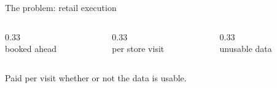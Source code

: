 \begin{frame}{The problem: retail execution}
  \centering
  \begin{columns}[T]
    \begin{column}{0.33\textwidth}\centering
      {\fontsize{28}{32}\selectfont\bfseries\color{cardano}\LeadTimeDays}\\ booked ahead
    \end{column}
    \begin{column}{0.33\textwidth}\centering
      {\fontsize{28}{32}\selectfont\bfseries\color{cardano}\CostPerVisit}\\ per store visit
    \end{column}
    \begin{column}{0.33\textwidth}\centering
      {\fontsize{28}{32}\selectfont\bfseries\color{cardano}\WasteShare}\\ unusable data
    \end{column}
  \end{columns}
  \vspace{1.5em}
  {\Large Paid per visit \alert{whether or not the data is usable.}}\\[0.5em]
\end{frame}
